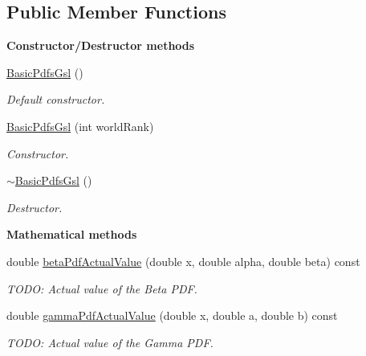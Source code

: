 \subsection*{Public Member Functions}
\begin{Indent}{\bf Constructor/\-Destructor methods}\par
\begin{DoxyCompactItemize}
\item 
\hyperlink{class_q_u_e_s_o_1_1_basic_pdfs_gsl_a3df72eb1474638a1bb364524ff397c4d}{Basic\-Pdfs\-Gsl} ()
\begin{DoxyCompactList}\small\item\em Default constructor. \end{DoxyCompactList}\item 
\hyperlink{class_q_u_e_s_o_1_1_basic_pdfs_gsl_acfb4ea894ec318fe99c6afa5fe86b8fe}{Basic\-Pdfs\-Gsl} (int world\-Rank)
\begin{DoxyCompactList}\small\item\em Constructor. \end{DoxyCompactList}\item 
\hyperlink{class_q_u_e_s_o_1_1_basic_pdfs_gsl_a477e6898a9ed8204f5d9d36dc0b6bf3a}{$\sim$\-Basic\-Pdfs\-Gsl} ()
\begin{DoxyCompactList}\small\item\em Destructor. \end{DoxyCompactList}\end{DoxyCompactItemize}
\end{Indent}
\begin{Indent}{\bf Mathematical methods}\par
\begin{DoxyCompactItemize}
\item 
double \hyperlink{class_q_u_e_s_o_1_1_basic_pdfs_gsl_aaae1aaf761e7129c7f158a06e3ecdfc1}{beta\-Pdf\-Actual\-Value} (double x, double alpha, double beta) const 
\begin{DoxyCompactList}\small\item\em T\-O\-D\-O\-: Actual value of the Beta P\-D\-F. \end{DoxyCompactList}\item 
double \hyperlink{class_q_u_e_s_o_1_1_basic_pdfs_gsl_a6bb250677b5c8c94bd3f690a58efaade}{gamma\-Pdf\-Actual\-Value} (double x, double a, double b) const 
\begin{DoxyCompactList}\small\item\em T\-O\-D\-O\-: Actual value of the Gamma P\-D\-F. \end{DoxyCompactList}\end{DoxyCompactItemize}
\end{Indent}
